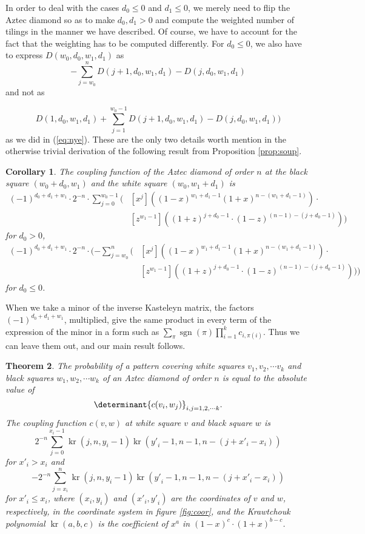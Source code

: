 \documentclass[10pt,reqno]{amsart}
\theoremstyle{plain}
\newtheorem{Thm}{Theorem}
\newtheorem{Cor}[Thm]{Corollary}
\theoremstyle{definition}
\theoremstyle{remark}
\DeclareMathOperator{\sgn }{sgn }
\DeclareMathOperator{\kr }{kr}
\begin{document}
In order to deal with the cases $d_0\leq 0$ and $d_1\leq 0$,
we merely need to flip
the Aztec diamond so as to make $d_0,d_1>0$ and
compute the weighted number of tilings in the manner we have described.
Of course, we have to account for the fact that the weighting has to
be computed differently. For $d_0\leq 0$, we also have to express
$D(w_0,d_0,w_1,d_1)$ as
\[
- \sum_{j=w_0}^n D(j+1,d_0,w_1,d_1)-D(j,d_0,w_1,d_1)
\] and not as

\[
D(1,d_0,w_1,d_1) +
\sum_{j=1}^{w_0-1} D(j+1,d_0,w_1,d_1)-D(j,d_0,w_1,d_1)) 
\]
as we did in (\ref{eq:nye}). These are the only two details worth mention
in the otherwise trivial derivation of the following result
from Proposition \ref{prop:soup}.
\begin{Cor}
The coupling function of the Aztec diamond of order
 $n$ at the black square $(w_0+d_0,w_1)$
and the white square $(w_0,w_1+d_1)$ is
\begin{equation}
\begin{aligned}
(-1)^{d_0+d_1+w_1}\cdot 2^{-n}\cdot 
\sum_{j=0}^{w_0-1}
(&[x^j]((1-x)^{w_1+d_1-1}(1+x)^{n-(w_1+d_1-1)})\cdot \\
&[z^{w_1-1}]((1+z)^{j+d_0-1} \cdot (1-z)^{(n-1)-(j+d_0-1)}))
\end{aligned}
\end{equation}
for $d_0>0$,
\begin{equation}
\begin{aligned}
(-1)^{d_0+d_1+w_1}\cdot 2^{-n}\cdot 
(-\sum_{j=w_0}^n
(&[x^j]((1-x)^{w_1+d_1-1}(1+x)^{n-(w_1+d_1-1)})\cdot \\
&[z^{w_1-1}]((1+z)^{j+d_0-1} \cdot (1-z)^{(n-1)-(j+d_0-1)})))
\end{aligned}
\end{equation}
for $d_0\leq 0$.
\end{Cor}
When we take a minor of the inverse Kasteleyn matrix,
the factors $(-1)^{d_0+d_1+w_1}$, multiplied, give the same product
in every term of the expression of the minor in a form such as
$\sum_{\pi} \sgn(\pi ) \prod_{i=1}^k c_{i,\pi(i)}$. Thus we can
leave them out, and our main
result follows.
\begin{Thm}
The probability of a pattern covering white squares $v_1,v_2,\dotsb v_k$
and black squares $w_1,w_2,\dotsb w_k$ of
 an Aztec diamond of order $n$ is equal
to the absolute value of
\[\determinant{c(v_i,w_j)}_{i,j=1,2,\dotsb k}.\]
The {\em coupling function} $c(v,w)$ at white square $v$ and black
square $w$ is 
\[2^{-n} \sum_{j=0}^{x_i-1} \kr(j,n,y_i-1) 
			    \kr({y\prime }_i - 1,n-1,n-(j+{x\prime }_i-x_i))
\]
for ${x\prime }_i > x_i$ and
\[-2^{-n} \sum_{j=x_i}^n \kr(j,n,y_i-1) 
			 \kr({y\prime }_i-1,n-1,n-(j+{x\prime }_i-x_i))
\]
for ${x\prime }_i \leq x_i$, where $(x_i,y_i)$ and $({x\prime}_i,{y\prime}_i)$
are the coordinates of $v$ and $w$, respectively, in the coordinate
system in figure \ref{fig:coor}, and the {\em Krawtchouk polynomial}
$\kr(a,b,c)$ is the coefficient of $x^a$ in $(1-x)^c\cdot (1+x)^{b-c}$.
\end{Thm}
\end{document}
